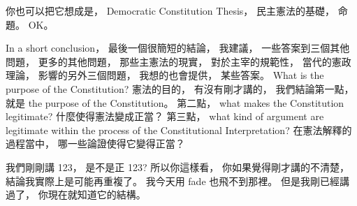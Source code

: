 \hypertarget{w02:cue:836}{}你也可以把它想成是，
\hypertarget{w02:cue:837}{}Democratic Constitution Thesis，
\hypertarget{w02:cue:838}{}民主憲法的基礎，
\hypertarget{w02:cue:839}{}命題。
\hypertarget{w02:cue:840}{}OK。

\hypertarget{w02:cue:841}{}In a short conclusion，
\hypertarget{w02:cue:842}{}最後一個很簡短的結論，
\hypertarget{w02:cue:843}{}我建議，
\hypertarget{w02:cue:844}{}一些答案到三個其他問題，
\hypertarget{w02:cue:845}{}更多的其他問題，
\hypertarget{w02:cue:846}{}那些主憲法的現實，
\hypertarget{w02:cue:847}{}對於主宰的規範性，
\hypertarget{w02:cue:848}{}當代的憲政理論，
\hypertarget{w02:cue:849}{}影響的另外三個問題，
\hypertarget{w02:cue:850}{}我想的也會提供，
\hypertarget{w02:cue:851}{}某些答案。
\hypertarget{w02:cue:852}{}What is the purpose of the Constitution?
\hypertarget{w02:cue:853}{}憲法的目的，
\hypertarget{w02:cue:854}{}有沒有剛才講的，
\hypertarget{w02:cue:855}{}我們結論第一點，
\hypertarget{w02:cue:856}{}就是 the purpose of the Constitution。
\hypertarget{w02:cue:857}{}第二點，
\hypertarget{w02:cue:858}{}what makes the Constitution legitimate?
\hypertarget{w02:cue:859}{}什麼使得憲法變成正當？
\hypertarget{w02:cue:860}{}第三點，
\hypertarget{w02:cue:861}{}what kind of argument are legitimate
\hypertarget{w02:cue:862}{}within the process of the Constitutional Interpretation?
\hypertarget{w02:cue:863}{}在憲法解釋的過程當中，
\hypertarget{w02:cue:864}{}哪一些論證使得它變得正當？

\hypertarget{w02:cue:865}{}我們剛剛講 123，
\hypertarget{w02:cue:866}{}是不是正 123?
\hypertarget{w02:cue:867}{}所以你這樣看，
\hypertarget{w02:cue:868}{}你如果覺得剛才講的不清楚，
\hypertarget{w02:cue:869}{}結論我實際上是可能再重複了。
\hypertarget{w02:cue:870}{}我今天用 fade 也飛不到那裡。
\hypertarget{w02:cue:871}{}但是我剛已經講過了，
\hypertarget{w02:cue:872}{}你現在就知道它的結構。

